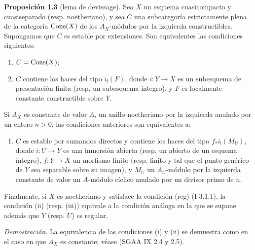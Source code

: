 \textbf{Proposición 1.3} (lema de devissage). Sea $X$ un esquema cuasicompacto y cuasiseparado (resp. noetheriano), y sea $C$ una subcategoría estrictamente plena de la categoría $\operatorname{Cons}(X)$ de los $A_X$-módulos por la izquierda constructibles. Supongamos que $C$ es estable por extensiones. Son equivalentes las condiciones siguientes:
\begin{enumerate}[label=(\roman*)]
\item $C=\operatorname{Cons}(X)$;
\item $C$ contiene los haces del tipo $i_!(F)$, donde $i:Y\to X$ es un subesquema de presentación finita (resp. un subesquema íntegro), y $F$ es localmente constante constructible sobre $Y$.
\end{enumerate}
Si $A_X$ es constante de valor $A$, un anillo noetheriano por la izquierda anulado por un entero $n>0$, las condiciones anteriores son equivalentes a:
\begin{enumerate}[label=(\roman*),start=3]
\item $C$ es estable por sumandos directos y contiene los haces del tipo $f_*i_!(M_U)$, donde $i:U\to Y$ es una inmersión abierta (resp. un abierto de un esquema íntegro), $f:Y\to X$ un morfismo finito (resp. finito y tal que el punto genérico de $Y$ sea separable sobre su imagen), y $M_U$ un $A_U$-módulo por la izquierda constante de valor un $A$-módulo cíclico anulado por un divisor primo de $n$.
\end{enumerate}
Finalmente, si $X$ es noetheriano y satisface la condición (reg) (I 3.1.1), la condición (ii) (resp. (iii)) equivale a la condición análoga en la que se supone además que $Y$ (resp. $U$) es regular.

\emph{Demostración.} La equivalencia de las condiciones (i) y (ii) se demuestra como en el caso en que $A_X$ es constante; véase (SGAA IX 2.4 y 2.5).

